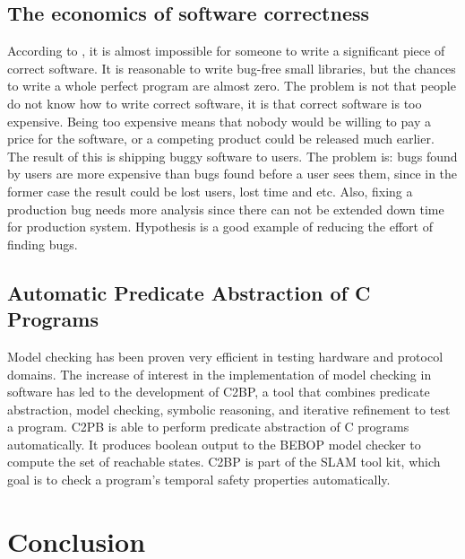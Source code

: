 \documentclass[preprint,nocopyrightspace]{sig-alternate}
\begin{document}
\subsection{The economics of software correctness}
According to \citet{maciver_economics_2015},
it is almost impossible for someone to write a significant piece of correct software.
It is reasonable to write bug-free small libraries,
but the chances to write a whole perfect program are almost zero.
The problem is not that people do not know how to write correct software,
it is that correct software is too expensive.
Being too expensive means that nobody would be willing to pay a price for the software,
or a competing product could be released much earlier.
The result of this is shipping buggy software to users.
The problem is:
bugs found by users are more expensive than bugs found before a user sees them,
since in the former case the result could be lost users, lost time and etc.
Also, fixing a production bug needs more analysis since
there can not be extended down time for production system.
Hypothesis is a good example of reducing the effort of finding bugs.

\subsection{Automatic Predicate Abstraction of C Programs}
Model checking has been proven very efficient in testing hardware and protocol domains.\citet{model_checking}
The increase of interest in the implementation of model checking in software has led to the development of C2BP,
a tool that combines predicate abstraction, model checking, symbolic reasoning, and iterative refinement to test a program.
C2PB is able to perform predicate abstraction of C programs automatically.
It produces boolean output to the BEBOP model checker to compute the set of reachable states.
C2BP is part of the SLAM tool kit, which goal is to check a program’s temporal safety properties automatically.

\section{Conclusion}




\end{document}
